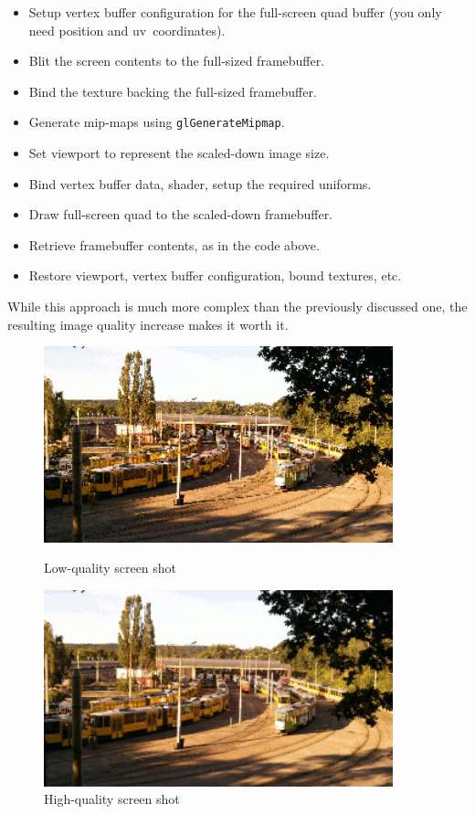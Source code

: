 \documentclass[hidelinks,titlepage,a4paper]{article}
\begin{document}
\begin{itemize}
\item Setup vertex buffer configuration for the full-screen quad buffer (you only need position and uv~coordinates).
\item Blit the screen contents to the full-sized framebuffer.
\item Bind the texture backing the full-sized framebuffer.
\item Generate mip-maps using \texttt{glGenerateMipmap}.
\item Set viewport to represent the scaled-down image size.
\item Bind vertex buffer data, shader, setup the required uniforms.
\item Draw full-screen quad to the scaled-down framebuffer.
\item Retrieve framebuffer contents, as in the code above.
\item Restore viewport, vertex buffer configuration, bound textures, etc.
\end{itemize}

While this approach is much more complex than the previously discussed one, the resulting image quality increase makes it worth it.

\begin{figure}[h]
\centering
\begin{minipage}{0.45\textwidth}
\centering
\includegraphics[width=0.9\textwidth]{images/screenshot-lo.png}
\caption{Low-quality screen shot}
\label{lowqualityss}
\end{minipage}\hfill
\begin{minipage}{0.45\textwidth}
\centering
\includegraphics[width=0.9\textwidth]{images/screenshot-hi.png}
\caption{High-quality screen shot}
\label{highqualityss}
\end{minipage}
\end{figure}
\end{document}
